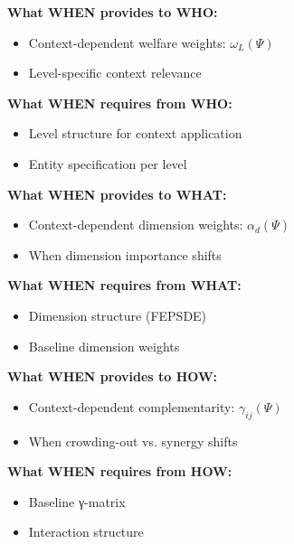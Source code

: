 \begin{tcolorbox}[colback=yellow!5!white, colframe=yellow!75!black,
    title=Integration: CORE-WHEN $\leftrightarrow$ CORE-WHO]
\textbf{What WHEN provides to WHO:}
\begin{itemize}[nosep]
\item Context-dependent welfare weights: $\omega_L(\Psi)$
\item Level-specific context relevance
\end{itemize}

\textbf{What WHEN requires from WHO:}
\begin{itemize}[nosep]
\item Level structure for context application
\item Entity specification per level
\end{itemize}
\end{tcolorbox}

\begin{tcolorbox}[colback=yellow!5!white, colframe=yellow!75!black,
    title=Integration: CORE-WHEN $\leftrightarrow$ CORE-WHAT]
\textbf{What WHEN provides to WHAT:}
\begin{itemize}[nosep]
\item Context-dependent dimension weights: $\alpha_d(\Psi)$
\item When dimension importance shifts
\end{itemize}

\textbf{What WHEN requires from WHAT:}
\begin{itemize}[nosep]
\item Dimension structure (FEPSDE)
\item Baseline dimension weights
\end{itemize}
\end{tcolorbox}

\begin{tcolorbox}[colback=yellow!5!white, colframe=yellow!75!black,
    title=Integration: CORE-WHEN $\leftrightarrow$ CORE-HOW]
\textbf{What WHEN provides to HOW:}
\begin{itemize}[nosep]
\item Context-dependent complementarity: $\gamma_{ij}(\Psi)$
\item When crowding-out vs. synergy shifts
\end{itemize}

\textbf{What WHEN requires from HOW:}
\begin{itemize}[nosep]
\item Baseline γ-matrix
\item Interaction structure
\end{itemize}
\end{tcolorbox}

